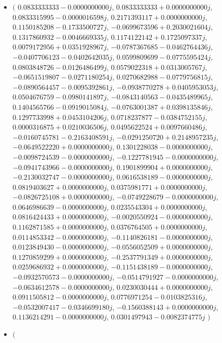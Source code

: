 \documentclass[14pt,a4paper]{article}
\begin{document}
\begin{itemize}
\item
$\big($
$0.0833333333-0.0000000000j$, $0.0833333333+0.0000000000j$, $0.0833315995-0.0000016598j$, $0.2171393117+0.0000000000j$, $0.1150185208-0.1733500727j$, $-0.0699673596+0.2030021604j$, $0.1317860932-0.0046669335j$, $0.1174122142+0.1725097337j$, $0.0079172956+0.0351928967j$, $-0.0787367685-0.0462764436j$, $-0.0407706123-0.0402642035j$, $0.0599809699-0.0775595424j$, $0.0803848726-0.0126486499j$, $0.0579022318+0.0313005767j$, $-0.0651519807-0.0271180254j$, $0.0270682988-0.0779756815j$, $-0.0890564457-0.0095392861j$, $-0.0938770278+0.0405953053j$, $0.0504676759-0.0980141897j$, $-0.0843140563-0.0435489965j$, $0.1404565766-0.0919015084j$, $-0.0763001387+0.0398135846j$, $0.1297733998+0.0453104206j$, $0.0718237877-0.0384752155j$, $0.0000316875+0.0210036506j$, $0.0495622524+0.0097660486j$, $-0.0160745781-0.2163408591j$, $-0.0291250720+0.2148957235j$, $-0.0649522220+0.0000000000j$, $0.1301228038-0.0000000000j$, $-0.0098724539-0.0000000000j$, $-0.1227781945-0.0000000000j$, $-0.0941743966-0.0000000000j$, $0.1901899904+0.0000000000j$, $-0.2130032747-0.0000000000j$, $0.0616538189-0.0000000000j$, $0.0819403627+0.0000000000j$, $0.0375981771+0.0000000000j$, $-0.0826725108+0.0000000000j$, $-0.0749228679-0.0000000000j$, $0.0646986639-0.0000000000j$, $0.0235543304+0.0000000000j$, $0.0816424433+0.0000000000j$, $-0.0020550924-0.0000000000j$, $0.1162871585+0.0000000000j$, $0.0376764505+0.0000000000j$, $0.0114853342-0.0000000000j$, $-0.1140826181-0.0000000000j$, $0.0123849430-0.0000000000j$, $-0.0556052509+0.0000000000j$, $0.1270859299+0.0000000000j$, $-0.2537791349+0.0000000000j$, $0.0259686932+0.0000000000j$, $-0.1151438189-0.0000000000j$, $-0.0932570573-0.0000000000j$, $-0.0514791927-0.0000000000j$, $-0.0634612578-0.0000000000j$, $0.0230030444+0.0000000000j$, $0.0911505812-0.0000000000j$, $0.0776971254-0.0103825316j$, $-0.0532007417-0.0346699180j$, $-0.1560388143+0.0000000000j$, $0.1136214291-0.0000000000j$, $0.0301497943-0.0082374775j$
$\big)$
\item
$\big($

\end{itemize}
\end{document}
